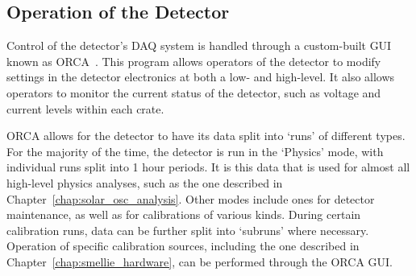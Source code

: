\subsection{Operation of the Detector}\label{sec:detector_ops}
Control of the detector's DAQ system is handled through a custom-built GUI known as ORCA~\cite{howeSudburyNeutrinoObservatory2004}. %
This program allows operators of the detector to modify settings in the detector electronics at both a low- and high-level. It also allows operators to monitor the current status of the detector, such as voltage and current levels within each crate.

ORCA allows for the detector to have its data split into `runs' of different types. For the majority of the time, the detector is run in the `Physics' mode, with individual runs split into 1 hour periods. It is this data that is used for almost all high-level physics analyses, such as the one described in Chapter~\ref{chap:solar_osc_analysis}. Other modes include ones for detector maintenance, as well as for calibrations of various kinds. During certain calibration runs, data can be further split into `subruns' where necessary. Operation of specific calibration sources, including the one described in Chapter~\ref{chap:smellie_hardware}, can be performed through the ORCA GUI.


